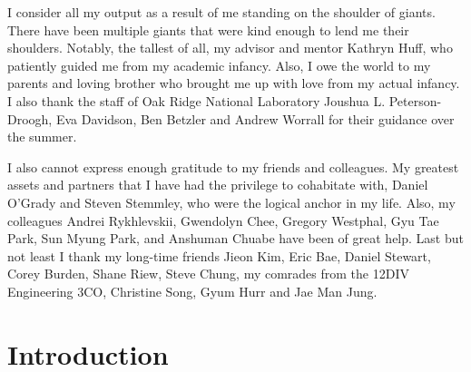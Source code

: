 \documentclass{report}
\begin{document}
I consider all my output as a result of me standing on the shoulder
of giants. There have been multiple giants that were kind enough
to lend me their shoulders. Notably, the tallest of all, my advisor
and mentor Kathryn Huff, who patiently guided me from my academic
infancy. Also, I owe the world to my parents and loving brother who
brought me up with love
from my actual infancy.  I also thank the staff of Oak Ridge National Laboratory
Joushua L. Peterson-Droogh, Eva Davidson, Ben Betzler and Andrew Worrall for their
guidance over the summer.

I also cannot express enough gratitude to my friends and colleagues. My greatest
assets and partners that I have had the privilege to cohabitate with, Daniel
O'Grady and Steven Stemmley, who were the logical anchor in my life. Also, my colleagues
Andrei Rykhlevskii, Gwendolyn Chee, Gregory Westphal, Gyu Tae Park, Sun Myung Park, and
Anshuman Chuabe have been of great help. Last but not least I thank my long-time friends Jieon Kim,
Eric Bae, Daniel Stewart, Corey Burden, Shane Riew, Steve Chung, my comrades from the 12DIV Engineering 3CO,
Christine Song, Gyum Hurr and Jae Man Jung.



\tableofcontents
\listoftables
\listoffigures


\pagebreak

\chapter{Introduction}

\end{document}
